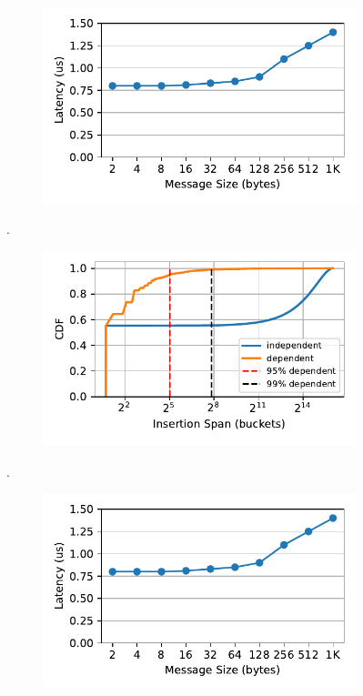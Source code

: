 \begin{figure}[t]
    \centering
    \begin{subfigure}{0.3\linewidth}
        \includegraphics[width=0.99\linewidth]{fig/rdma_latency.pdf}
        \label{fig:rdma_latency}
    \end{subfigure}.
    \begin{subfigure}{0.3\linewidth}
        \includegraphics[width=0.99\linewidth]{fig/insertion_span.pdf}
        \label{fig:insertion_span}
    \end{subfigure}.
    \begin{subfigure}{0.3\linewidth}
        \includegraphics[width=0.99\linewidth]{fig/rdma_latency.pdf}

\end{subfigure}
\end{figure}
